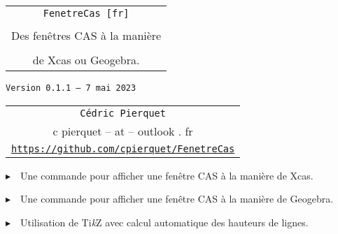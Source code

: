 \documentclass[french,a4paper,11pt]{article}
\def\TPversion{0.1.1}
\def\TPdate{7 mai 2023}
\providecommand\tikzlogo{Ti\textit{k}Z}
\let\TikZ\tikzlogo
\begin{document}
\setlength{\aweboxleftmargin}{0.07\linewidth}
\setlength{\aweboxcontentwidth}{0.93\linewidth}
\setlength{\aweboxvskip}{8pt}

\pagestyle{fancy}

\thispagestyle{empty}

\vspace{2cm}

\begin{center}
	\begin{minipage}{0.75\linewidth}
	\begin{tcolorbox}[colframe=yellow,colback=yellow!15]
		\begin{center}
			\begin{tabular}{c}
				{\Huge \texttt{FenetreCas [fr]}}\\
				\\
				{\LARGE Des fenêtres CAS à la manière} \\
				\\
				{\LARGE de Xcas ou Geogebra.} \\
			\end{tabular}
			
			\bigskip
			
			{\small \texttt{Version \TPversion{} -- \TPdate}}
		\end{center}
	\end{tcolorbox}
\end{minipage}
\end{center}

\begin{center}
	\begin{tabular}{c}
	\texttt{Cédric Pierquet}\\
	{\ttfamily c pierquet -- at -- outlook . fr}\\
	\texttt{\url{https://github.com/cpierquet/FenetreCas}}
\end{tabular}
\end{center}

\vspace{0.25cm}

{$\blacktriangleright$~~Une commande pour afficher une fenêtre CAS à la manière de \textsf{Xcas}.}

\smallskip

{$\blacktriangleright$~~Une commande pour afficher une fenêtre CAS à la manière de \textsf{Geogebra}.}

\smallskip

{$\blacktriangleright$~~Utilisation de \TikZ{} avec calcul automatique des hauteurs de lignes.}
\end{document}
